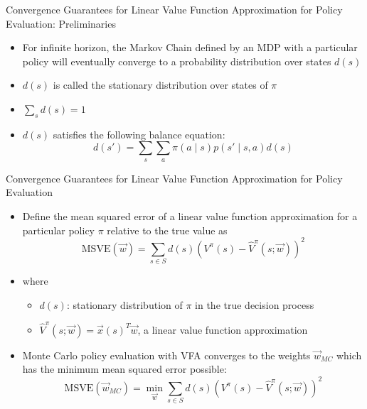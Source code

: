 \begin{frame}[c]{Convergence Guarantees for Linear Value Function	Approximation for Policy Evaluation: Preliminaries}
	
	\begin{itemize}
		\item For infinite horizon, the Markov Chain defined by an MDP with a particular policy will eventually converge to a probability distribution over states $d(s)$
		\item $d(s)$ is called the stationary distribution over states of $\pi$
		\item $\sum_{s} d(s) = 1$
		\item $d(s)$ satisfies the following balance equation:
		$$ d(s') = \sum_{s} \sum_{a} \pi(a \mid s) p(s' \mid s,a) d(s) $$
	\end{itemize}
	
\end{frame}
\begin{frame}[c]{Convergence Guarantees for Linear Value Function
		Approximation for Policy Evaluation }
	
	\begin{itemize}
		\item Define the mean squared error of a linear value function approximation for a particular policy $\pi$  relative to the true value as 
		$$\text{MSVE}(\vec{w}) = \sum_{s \in S} d(s) (V^\pi (s) - \hat{V}^\pi(s;\vec{w}))^2 $$
		\item where
		\begin{itemize}
			\item $d(s)$: stationary distribution of $\pi$ in the true decision process
			\item $\hat{V}^\pi(s;\vec{w}) = \vec{x}(s)^T\vec{w}$, a linear value function approximation
		\end{itemize}
		\item Monte Carlo policy evaluation with VFA converges to the weights $\vec{w}_{MC}$ which has the minimum mean squared error possible:
		$$\text{MSVE}(\vec{w}_{MC}) = \min_{\vec{w}}\sum_{s \in S} d(s) (V^\pi (s) - \hat{V}^\pi(s;\vec{w}))^2 $$
	\end{itemize}
	
\end{frame}

